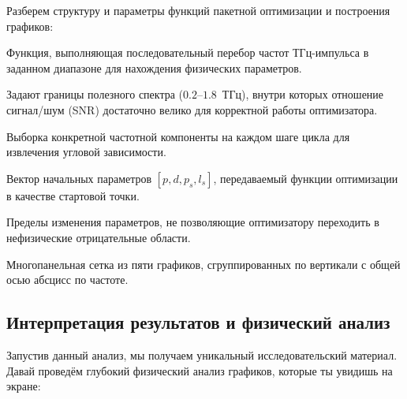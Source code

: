 Разберем структуру и параметры функций пакетной оптимизации и построения графиков:

\begin{syntaxdesc}
    \item[Имя функции \mycode{analyze_polarizer_over_spectrum}] Функция, выполняющая последовательный перебор частот ТГц-импульса в заданном диапазоне для нахождения физических параметров.
    \item[Рабочий диапазон \mycode{freq_start} и \mycode{freq_end}] Задают границы полезного спектра ($0.2$--$1.8$~ТГц), внутри которых отношение сигнал/шум (SNR) достаточно велико для корректной работы оптимизатора.
    \item[Выбор частоты \mycode{freqs[idx]}] Выборка конкретной частотной компоненты на каждом шаге цикла для извлечения угловой зависимости.
    \item[Начальное приближение \mycode{initial_guess}] Вектор начальных параметров $[p, d, p_s, l_s]$, передаваемый функции оптимизации в качестве стартовой точки.
    \item[Границы поиска \mycode{bounds}] Пределы изменения параметров, не позволяющие оптимизатору переходить в нефизические отрицательные области.
    \item[Панели графика \mycode{axs[0]} -- \mycode{axs[4]}] Многопанельная сетка из пяти графиков, сгруппированных по вертикали с общей осью абсцисс по частоте.
\end{syntaxdesc}

\subsection{Интерпретация результатов и физический анализ}

Запустив данный анализ, мы получаем уникальный исследовательский материал. Давай проведём глубокий физический анализ графиков, которые ты увидишь на экране:

